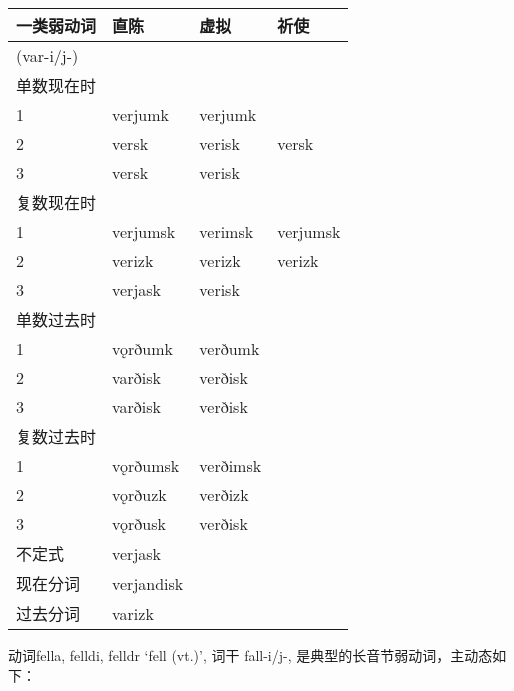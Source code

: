 \begin{longtable}{llll}
    \toprule
    一类弱动词      & 直陈         & 虚拟       & 祈使       \\
    \midrule
    \endhead
    \bottomrule
    \endfoot
    (var-i/j-) &            &          &          \\
    单数现在时      &            &          &          \\
    1          & verjumk    & verjumk  &          \\
    2          & versk      & verisk   & versk    \\
    3          & versk      & verisk   &          \\
    复数现在时      &            &          &          \\
    1          & verjumsk   & verimsk  & verjumsk \\
    2          & verizk     & verizk   & verizk   \\
    3          & verjask    & verisk   &          \\
    单数过去时      &            &          &          \\
    1          & vǫrðumk    & verðumk  &          \\
    2          & varðisk    & verðisk  &          \\
    3          & varðisk    & verðisk  &          \\
    复数过去时      &            &          &          \\
    1          & vǫrðumsk   & verðimsk &          \\
    2          & vǫrðuzk    & verðizk  &          \\
    3          & vǫrðusk    & verðisk  &          \\
    不定式        & verjask    &          &          \\
    现在分词       & verjandisk &          &          \\
    过去分词       & varizk     &          &          \\
\end{longtable}

动词fella, felldi, felldr `fell (vt.)‌', 词干 fall-i/j-,
是典型的长音节弱动词，主动态如下：

